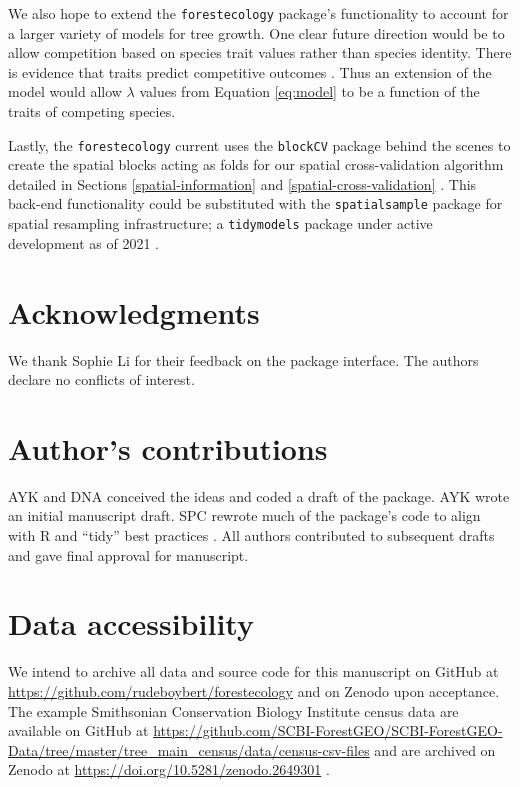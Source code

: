 \documentclass[12pt]{article}
\begin{document}
We also hope to extend the \texttt{forestecology} package's
functionality to account for a larger variety of models for tree growth.
One clear future direction would be to allow competition based on
species trait values rather than species identity. There is evidence
that traits predict competitive outcomes
\citep[\citet{lasky_trait-mediated_2014},
\citet{uriarte_trait_2010}]{kunstler_competitive_2012}. Thus an
extension of the model would allow \(\lambda\) values from Equation
\ref{eq:model} to be a function of the traits of competing species.

Lastly, the \texttt{forestecology} current uses the \texttt{blockCV}
package behind the scenes to create the spatial blocks acting as folds
for our spatial cross-validation algorithm detailed in Sections
\ref{spatial-information} and \ref{spatial-cross-validation}
\citep{valavi_blockcv_2019}. This back-end functionality could be
substituted with the \texttt{spatialsample} package for spatial
resampling infrastructure; a \texttt{tidymodels} package under active
development as of 2021
\citep[\citet{tidymodels_package}]{spatialsample_package}.

\hypertarget{acknowledgments}{%
\section{Acknowledgments}\label{acknowledgments}}

We thank Sophie Li for their feedback on the package interface. The
authors declare no conflicts of interest.

\hypertarget{authors-contributions}{%
\section{Author's contributions}\label{authors-contributions}}

AYK and DNA conceived the ideas and coded a draft of the package. AYK
wrote an initial manuscript draft. SPC rewrote much of the package's
code to align with R and ``tidy'' best practices
\citep{wickham_welcome_2019}. All authors contributed to subsequent
drafts and gave final approval for manuscript.

\hypertarget{data-accessibility}{%
\section{Data accessibility}\label{data-accessibility}}

We intend to archive all data and source code for this manuscript on
GitHub at \url{https://github.com/rudeboybert/forestecology} and on
Zenodo upon acceptance. The example Smithsonian Conservation Biology
Institute census data are available on GitHub at
\url{https://github.com/SCBI-ForestGEO/SCBI-ForestGEO-Data/tree/master/tree_main_census/data/census-csv-files}
and are archived on Zenodo at
\url{https://doi.org/10.5281/zenodo.2649301}
\citep{gonzalez-akre_scbi-forestgeoscbi-forestgeo-data_2020}.
\end{document}
